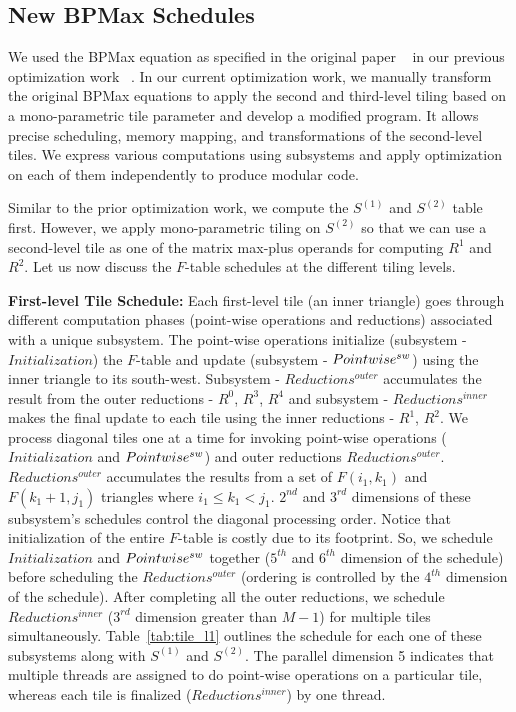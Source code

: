 




\subsection{New BPMax Schedules}
We used the BPMax equation as specified in the original paper ~\cite{EbrahimpourBoroojeny2021} in our previous optimization work ~\cite{Mondal2021}. In our current optimization work, we manually transform the original BPMax equations to apply the second and third-level tiling based on a mono-parametric tile parameter and develop a modified \alfa program. It allows precise scheduling, memory mapping, and transformations of the second-level tiles. We express various computations using subsystems and apply optimization on each of them independently to produce modular code.

Similar to the prior optimization work, we compute the $S^{(1)}$ and $S^{(2)}$ table first. However, we apply mono-parametric tiling on $S^{(2)}$ so that we can use a second-level tile as one of the matrix max-plus operands for computing $R^{1}$ and  $R^{2}$. Let us now discuss the $F$-table schedules at the different tiling levels.

\textbf{First-level Tile Schedule:}
Each first-level tile (an inner triangle) goes through different computation phases (point-wise operations and reductions) associated with a unique subsystem. The point-wise operations initialize (subsystem - $Initialization$) the $F$-table and update (subsystem - $Point\-wise^{sw}$) using the inner triangle to its south-west. Subsystem - $Reductions^{outer}$ accumulates the result from the outer reductions - $R^{0}$, $R^{3}$, $R^{4}$ and subsystem - $Reductions^{inner}$ makes the final update to each tile using the inner reductions - $R^{1}$, $R^{2}$. We process diagonal tiles one at a time for invoking point-wise operations ($Initialization$ and $Point\-wise^{sw}$) and outer reductions $Reductions^{outer}$. $Reductions^{outer}$ accumulates the results from a set of $F(i_{1}, k_{1})$ and $F(k_{1}+1, j_{1})$ triangles where $i_{1} \le k_{1} < j_{1}$.  $2^{nd}$ and $3^{rd}$ dimensions of these subsystem's schedules control the diagonal processing order. 
Notice that initialization of the entire $F$-table is costly due to its footprint. So, we schedule $Initialization$ and $Point\-wise^{sw}$ together ($5^{th}$ and $6^{th}$ dimension of the schedule) before scheduling the $Reductions^{outer}$ (ordering is controlled by the $4^{th}$ dimension of the schedule). After completing all the outer reductions, we schedule $Reductions^{inner}$ ($3^{rd}$ dimension greater than $M-1$) for multiple tiles simultaneously. Table~\ref{tab:tile_l1} outlines the schedule for each one of these subsystems along with $S^{(1)}$ and $S^{(2)}$. The parallel dimension 5 indicates that multiple threads are assigned to do point-wise operations on a particular tile, whereas each tile is finalized ($Reductions^{inner}$) by one thread.


